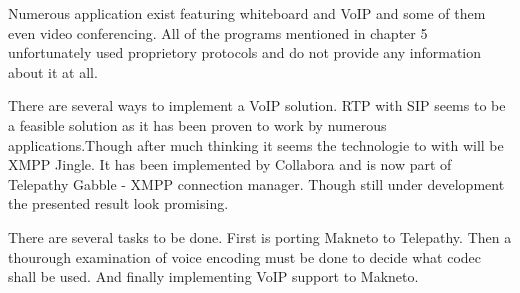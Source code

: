 Numerous application exist featuring whiteboard and VoIP and some of them even video conferencing. All of the programs mentioned in chapter 5 unfortunately used proprietory protocols and do not provide any information about it at all. 

There are several ways to implement a VoIP solution. RTP with SIP seems to be a feasible solution as it has been proven to work by numerous applications.Though after much thinking it seems the technologie to with will be XMPP Jingle. It has been implemented by Collabora and is now part of Telepathy Gabble - XMPP connection manager. Though still under development the presented result look promising.

There are several tasks to be done. First is porting Makneto to Telepathy. Then a thourough examination of voice encoding must be done to decide what codec shall be used. And finally implementing VoIP support to Makneto.   



